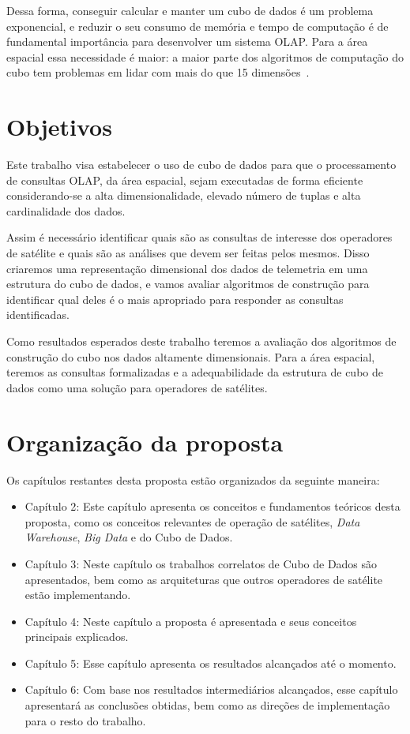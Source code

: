 Dessa forma, conseguir calcular e manter um cubo de dados é um problema exponencial, e reduzir o seu consumo de memória e tempo de computação é de fundamental importância para desenvolver um sistema OLAP.
Para a área espacial essa necessidade é maior: a maior parte dos algoritmos de computação do cubo tem problemas em lidar com mais do que 15 dimensões~\cite{silva:2015:abordagensParaCubo}.

\section{Objetivos}\label{ch:intro:obj}

Este trabalho visa estabelecer o uso de cubo de dados para que o processamento de consultas OLAP, da área espacial, sejam executadas de forma eficiente considerando-se a alta dimensionalidade, elevado número de tuplas e alta cardinalidade dos dados.

Assim é necessário identificar quais são as consultas de interesse dos operadores de satélite e quais são as análises que devem ser feitas pelos mesmos.
Disso criaremos uma representação dimensional dos dados de telemetria em uma estrutura do cubo de dados, e vamos avaliar algoritmos de construção para identificar qual deles é o mais apropriado para responder as consultas identificadas.

Como resultados esperados deste trabalho teremos a avaliação dos algoritmos de construção do cubo nos dados altamente dimensionais.
Para a área espacial, teremos as consultas formalizadas e a adequabilidade da estrutura de cubo de dados como uma solução para operadores de satélites.

\section{Organização da proposta}\label{ch:intro:org}

Os capítulos restantes desta proposta estão organizados da seguinte maneira:

\begin{itemize}
	\item{Capítulo 2}: Este capítulo apresenta os conceitos e fundamentos teóricos desta proposta, como os conceitos relevantes de operação de satélites, \textit{Data Warehouse}, \textit{Big Data} e do Cubo de Dados.
	\item{Capítulo 3}: Neste capítulo os trabalhos correlatos de Cubo de Dados são apresentados, bem como as arquiteturas que outros operadores de satélite estão implementando.
	\item{Capítulo 4}: {\color{red} Neste capítulo a proposta é apresentada e seus conceitos principais explicados.}
	\item{Capítulo 5}: Esse capítulo apresenta os resultados alcançados até o momento.
	\item{Capítulo 6}: Com base nos resultados intermediários alcançados, esse capítulo apresentará as conclusões obtidas, bem como as direções de implementação para o resto do trabalho.
\end{itemize}

